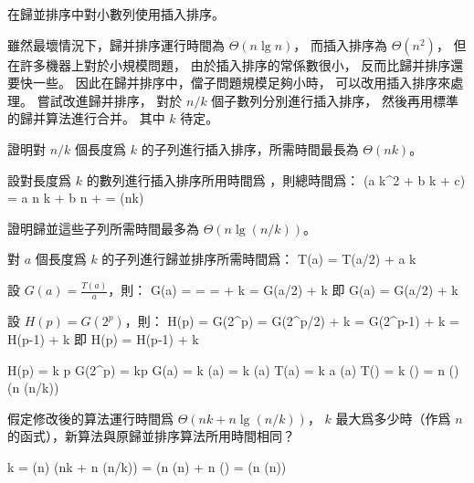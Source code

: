 \startPROBLEM
在歸並排序中對小數列使用插入排序。

雖然最壞情況下，歸并排序運行時間為 $\Theta(n\lg n)$，
而插入排序為 $\Theta(n^2)$，
但在許多機器上對於小規模問題，
由於插入排序的常係數很小，
反而比歸并排序還要快一些。
因此在歸并排序中，儅子問題規模足夠小時，
可以改用插入排序來處理。
嘗試改進歸并排序，
對於 $n/k$ 個子數列分別進行插入排序，
然後再用標準的歸并算法進行合并。
其中 $k$ 待定。
\startigBase[a]

\item 證明對 $n/k$ 個長度爲 $k$ 的子列進行插入排序，所需時間最長為 $\Theta(nk)$。

\startANSWER
設對長度爲 $k$ 的數列進行插入排序所用時間爲 ，則總時間爲：
\startformula
{}(a k^2 + b k + c) = a n k + b n +  = \Theta(nk)
\stopformula
\stopANSWER

\item 證明歸並這些子列所需時間最多為 $\Theta(n \lg(n/k))$。

\startANSWER
對 $a$ 個長度爲 $k$ 的子列進行歸並排序所需時間爲：
\startformula
T(a) = \startcases
{}	\NC {} \NR
{} T(a/2) + a k \NC {} \NR
\stopcases
\stopformula

設 $G(a) = \frac{T(a)}{a}$，則：
\startsplitformula\startalign
\NC G(a)	\NC =  \NR
\NC 		\NC =  \NR
\NC		\NC =  + k \NR
\NC		\NC = G(a/2) + k \NR
\stopalign\stopsplitformula
即
\startformula
G(a) = \startcases
{}	\NC {}\NR
\NC G(a/2) + k \NC {} \NR
\stopcases
\stopformula

設 $H(p) = G(2^p)$，則：
\startsplitformula\startalign
\NC H(p)	\NC = G(2^p) \NR
\NC		\NC = G(2^p/2) + k \NR
\NC		\NC = G(2^{p-1}) + k \NR
\NC		\NC = H(p-1) + k \NR
\stopalign\stopsplitformula
即
\startformula
H(p) = \startcases
{}	\NC {} \NR
\NC H(p-1) + k \NC {} \NR
\stopcases
\stopformula

\startsplitformula\startalign
\NC H(p) \NC = k p \NR
\NC G(2^p) \NC = kp \NR
\NC G(a) \NC = k \lg(a) \NR
\NC {} \NC = k \lg(a) \NR
\NC T(a) \NC = k a \lg(a) \NR
\NC T() \NC = k  \lg() \NR
\NC		\NC = n \lg() \NR
\NC     \NC \Theta(n \lg(n/k)) \NR
\stopalign\stopsplitformula
\stopANSWER

\item 假定修改後的算法運行時間爲 $\Theta(nk+n \lg(n/k))$，
$k$ 最大爲多少時（作爲 $n$ 的函式），新算法與原歸並排序算法所用時間相同？

\startANSWER
\startsplitformula\startalign
\NC k \NC = \lg(n) \NR
\NC \Theta(nk + n \lg(n/k)) \NC = \Theta(n \lg(n) + n \lg() \NR
\NC			\NC = \Theta(n \lg(n)) \NR
\stopalign\stopsplitformula
\stopANSWER

\stopigBase
\stopPROBLEM
